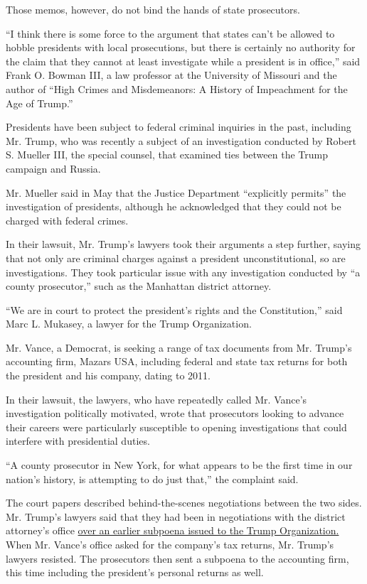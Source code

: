 Those memos, however, do not bind the hands of state prosecutors.

``I think there is some force to the argument that states can't be
allowed to hobble presidents with local prosecutions, but there is
certainly no authority for the claim that they cannot at least
investigate while a president is in office,'' said Frank O. Bowman III,
a law professor at the University of Missouri and the author of ``High
Crimes and Misdemeanors: A History of Impeachment for the Age of
Trump.''

Presidents have been subject to federal criminal inquiries in the past,
including Mr. Trump, who was recently a subject of an investigation
conducted by Robert S. Mueller III, the special counsel, that examined
ties between the Trump campaign and Russia.

Mr. Mueller said in May that the Justice Department ``explicitly
permits'' the investigation of presidents, although he acknowledged that
they could not be charged with federal crimes.

In their lawsuit, Mr. Trump's lawyers took their arguments a step
further, saying that not only are criminal charges against a president
unconstitutional, so are investigations. They took particular issue with
any investigation conducted by ``a county prosecutor,'' such as the
Manhattan district attorney.

``We are in court to protect the president's rights and the
Constitution,'' said Marc L. Mukasey, a lawyer for the Trump
Organization.

Mr. Vance, a Democrat, is seeking a range of tax documents from Mr.
Trump's accounting firm, Mazars USA, including federal and state tax
returns for both the president and his company, dating to 2011.

In their lawsuit, the lawyers, who have repeatedly called Mr. Vance's
investigation politically motivated, wrote that prosecutors looking to
advance their careers were particularly susceptible to opening
investigations that could interfere with presidential duties.

``A county prosecutor in New York, for what appears to be the first time
in our nation's history, is attempting to do just that,'' the complaint
said.

The court papers described behind-the-scenes negotiations between the
two sides. Mr. Trump's lawyers said that they had been in negotiations
with the district attorney's office
\href{https://www.nytimes.com/2019/08/01/nyregion/trump-cohen-stormy-daniels-vance.html}{over
an earlier subpoena issued to the Trump Organization.} When Mr. Vance's
office asked for the company's tax returns, Mr. Trump's lawyers
resisted. The prosecutors then sent a subpoena to the accounting firm,
this time including the president's personal returns as well.

